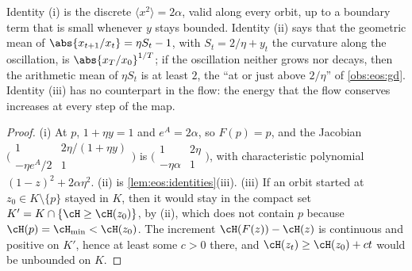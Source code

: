 \begin{refsection}
Identity (i) is the discrete $\langle x^2\rangle=2\alpha$, valid along every orbit, up to a boundary term that is small whenever $y$ stays bounded. Identity (ii) says that the geometric mean of $\abs{x_{t+1}/x_t}=\eta S_t-1$, with $S_t=2/\eta+y_t$ the curvature along the oscillation, is $\abs{x_T/x_0}^{1/T}$; if the oscillation neither grows nor decays, then the arithmetic mean of $\eta S_t$ is at least $2$, the ``at or just above $2/\eta$'' of \cref{obs:eos:gd}. Identity (iii) has no counterpart in the flow: the energy that the flow conserves increases at every step of the map.


\begin{proof}
(i) At $p$, $1+\eta y=1$ and $e^A=2\alpha$, so $F(p)=p$, and the Jacobian $\bigl(\begin{smallmatrix}1&2\eta/(1+\eta y)\\-\eta e^A/2&1\end{smallmatrix}\bigr)$ is $\bigl(\begin{smallmatrix}1&2\eta\\-\eta\alpha&1\end{smallmatrix}\bigr)$, with characteristic polynomial $(1-z)^2+2\alpha\eta^2$. (ii) is \cref{lem:eos:identities}(iii). (iii) If an orbit started at $z_0\in K\setminus\{p\}$ stayed in $K$, then it would stay in the compact set $K'=K\cap\{\cH\ge\cH(z_0)\}$, by (ii), which does not contain $p$ because $\cH(p)=\eosHmin<\cH(z_0)$. The increment $\cH(F(z))-\cH(z)$ is continuous and positive on $K'$, hence at least some $c>0$ there, and $\cH(z_t)\ge\cH(z_0)+ct$ would be unbounded on $K$.
\end{proof}


\end{refsection}

